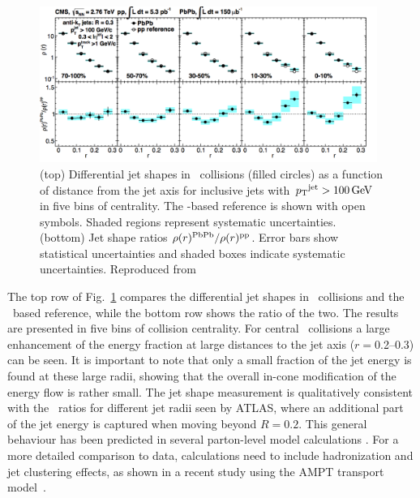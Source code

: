 \begin{figure}[!ht]
\begin{center}
\includegraphics[width=0.98\textwidth]{jetfigures/JetShapes_GR.png}
\caption{\label{fig:JSRatio}
(top) Differential jet shapes in \PbPb\ collisions (filled circles)
as a function of distance from the jet axis for inclusive jets with $\mbox{$p_{\mathrm{T}}$}^{\rm{jet}} >100\,\mathrm{GeV}$
in five bins of centrality.  The \pp-based reference is shown with open symbols.
Shaded regions represent systematic uncertainties.
(bottom) Jet shape ratios $\rho(r)^{\rm{PbPb}}/\rho(r)^{\rm{pp}}$.
Error bars show statistical uncertainties and shaded boxes indicate systematic uncertainties.
Reproduced from~\cite{Chatrchyan:2013kwa}}
\label{fig:GR:CMS_jetshapes}
\end{center}
\end{figure}

The top row of Fig.~\ref{fig:GR:CMS_jetshapes} compares the differential jet shapes in \PbPb\
collisions and the \pp\ based reference, while the bottom row shows the ratio of the two.
The results are presented in five bins of collision centrality.
For central \PbPb\ collisions a large enhancement of the energy fraction at large distances
to the jet axis ($r = $0.2--0.3) can be seen. It is important to note that only a small
fraction of the jet energy is found at these large radii, showing that the overall in-cone
modification of the energy flow is rather small.
The jet shape measurement is qualitatively consistent with the \Rcp\ ratios for different jet radii seen by ATLAS,
where an additional part of the jet energy is captured when moving beyond $R = 0.2$.
This general behaviour has been predicted in several parton-level model
calculations \cite{Vitev:2008rz,Renk:2009hv}.
For a more detailed comparison to data, calculations need to include hadronization and
jet clustering effects, as shown in a recent study using the AMPT transport model~\cite{Ma:2013uqa}.

